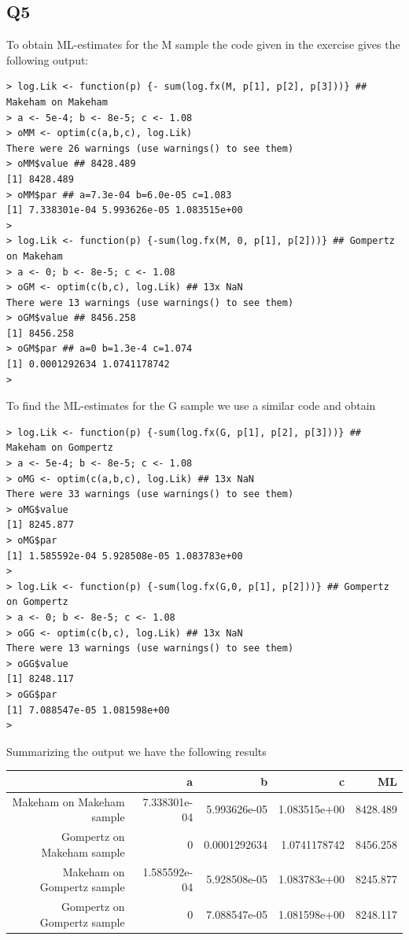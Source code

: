\subsection*{Q5}

To obtain ML-estimates for the M sample the code given in the exercise gives the following output:
\begin{verbatim}
> log.Lik <- function(p) {- sum(log.fx(M, p[1], p[2], p[3]))} ## Makeham on Makeham
> a <- 5e-4; b <- 8e-5; c <- 1.08
> oMM <- optim(c(a,b,c), log.Lik) 
There were 26 warnings (use warnings() to see them)
> oMM$value ## 8428.489
[1] 8428.489
> oMM$par ## a=7.3e-04 b=6.0e-05 c=1.083
[1] 7.338301e-04 5.993626e-05 1.083515e+00
> 
> log.Lik <- function(p) {-sum(log.fx(M, 0, p[1], p[2]))} ## Gompertz on Makeham
> a <- 0; b <- 8e-5; c <- 1.08
> oGM <- optim(c(b,c), log.Lik) ## 13x NaN
There were 13 warnings (use warnings() to see them)
> oGM$value ## 8456.258
[1] 8456.258
> oGM$par ## a=0 b=1.3e-4 c=1.074
[1] 0.0001292634 1.0741178742
>
\end{verbatim}

To find the ML-estimates for the G sample we use a similar code and obtain

\begin{verbatim}
> log.Lik <- function(p) {-sum(log.fx(G, p[1], p[2], p[3]))} ## Makeham on Gompertz
> a <- 5e-4; b <- 8e-5; c <- 1.08
> oMG <- optim(c(a,b,c), log.Lik) ## 13x NaN
There were 33 warnings (use warnings() to see them)
> oMG$value
[1] 8245.877
> oMG$par
[1] 1.585592e-04 5.928508e-05 1.083783e+00
> 
> log.Lik <- function(p) {-sum(log.fx(G,0, p[1], p[2]))} ## Gompertz on Gompertz
> a <- 0; b <- 8e-5; c <- 1.08
> oGG <- optim(c(b,c), log.Lik) ## 13x NaN
There were 13 warnings (use warnings() to see them)
> oGG$value
[1] 8248.117
> oGG$par
[1] 7.088547e-05 1.081598e+00
>
\end{verbatim}

Summarizing the output we have the following results 

\begin{center}

\begin{tabular}{r | r | r | r | r}
 							 & a & b & c & ML \\ \hline
 Makeham on Makeham sample 	 & 7.338301e-04 & 5.993626e-05 & 1.083515e+00 & 8428.489 \\
 Gompertz on Makeham sample  & 0 & 0.0001292634 & 1.0741178742 & 8456.258 \\
 Makeham on Gompertz sample  & 1.585592e-04 & 5.928508e-05 & 1.083783e+00 & 8245.877 \\
 Gompertz on Gompertz sample & 0 & 7.088547e-05 & 1.081598e+00 & 8248.117 
 
\end{tabular}

\end{center}

